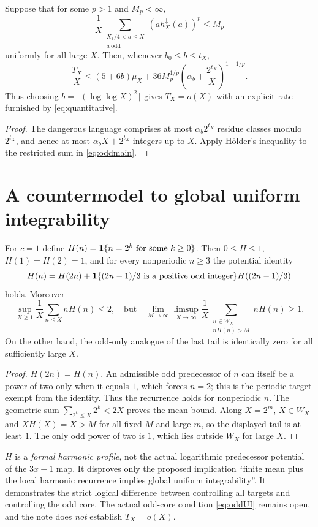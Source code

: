 \begin{corollary}\label{cor:oddlp}
Suppose that for some $p>1$ and $M_p<\infty$,
\[
 \frac1X\sum_{\substack{X_1/4<a\le X\\a\ \mathrm{odd}}}
   (a h_X^{\downarrow}(a))^p\le M_p
\]
uniformly for all large $X$.  Then, whenever $b_0\le b\le t_X$,
\begin{equation}\label{eq:quantitative}
 \frac{T_X}{X}\le(5+6b)\mu_X+
 36M_p^{1/p}\left(\alpha_b+\frac{2^{t_X}}X\right)^{1-1/p}.
\end{equation}
Thus choosing $b=\lceil(\log\log X)^2\rceil$ gives $T_X=o(X)$
with an explicit rate furnished by \eqref{eq:quantitative}.
\end{corollary}
\begin{proof}
The dangerous language comprises at most $\alpha_b2^{t_X}$
residue classes modulo $2^{t_X}$, and hence at most
$\alpha_b X+2^{t_X}$ integers up to $X$.  Apply H\"older's
inequality to the restricted sum in \eqref{eq:oddmain}.
\end{proof}

\section{A countermodel to global uniform integrability}
\begin{proposition}\label{prop:spine}
For $c=1$ define $H(n)=\mathbf1\{n=2^k\text{ for some }k\ge0\}$.
Then $0\le H\le1$, $H(1)=H(2)=1$, and for every nonperiodic
$n\ge3$ the potential identity
\[
 H(n)=H(2n)+
  \mathbf1\{(2n-1)/3\text{ is a positive odd integer}\}
 H((2n-1)/3)
\]
holds.  Moreover
\[
 \sup_{X\ge1}\frac1X\sum_{n\le X}nH(n)\le2,
\quad\text{but}\quad
 \lim_{M\to\infty}\limsup_{X\to\infty}
 \frac1X\sum_{\substack{n\in W_X\\nH(n)>M}}nH(n)\ge1.
\]
On the other hand, the odd-only analogue of the last tail is
identically zero for all sufficiently large $X$.
\end{proposition}
\begin{proof}
$H(2n)=H(n)$.  An admissible odd predecessor of $n$ can itself
be a power of two only when it equals $1$, which forces $n=2$;
this is the periodic target exempt from the identity.  Thus the
recurrence holds for nonperiodic $n$.  The geometric sum
$\sum_{2^k\le X}2^k<2X$ proves the mean bound.  Along $X=2^m$,
$X\in W_X$ and $XH(X)=X>M$ for all fixed $M$ and large $m$,
so the displayed tail is at least $1$.  The only odd power of
two is $1$, which lies outside $W_X$ for large $X$.
\end{proof}
\begin{remark}
$H$ is a \emph{formal harmonic profile}, not the actual logarithmic
predecessor potential of the $3x+1$ map.  It disproves only the
proposed implication ``finite mean plus the local harmonic recurrence
implies global uniform integrability''.  It demonstrates the strict
logical difference between controlling all targets and controlling
the odd core.  The actual odd-core condition \eqref{eq:oddUI} remains
open, and the note does \emph{not} establish $T_X=o(X)$.
\end{remark}

